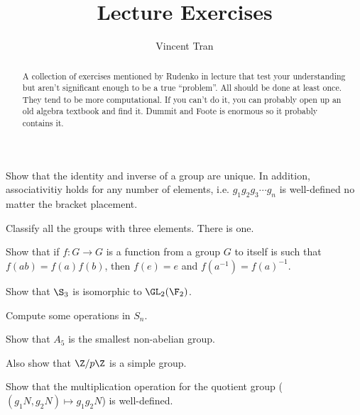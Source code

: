 \documentclass{amsart}
\title{Lecture Exercises}
\author{Vincent Tran}
\begin{document}
\begin{abstract}
	A collection of exercises mentioned by Rudenko in lecture that test your understanding but aren't significant enough to be a true ``problem''.
	All should be done at least once.
	They tend to be more computational.
	If you can't do it, you can probably open up an old algebra textbook and find it.
	Dummit and Foote is enormous so it probably contains it.
\end{abstract}

\maketitle

\begin{exercise}
	Show that the identity and inverse of a group are unique.
	In addition, associativitiy holds for any number of elements, i.e. $g_{1}g_{2}g_{3}\cdots g_n $ is well-defined no matter the bracket placement.
\end{exercise}

\begin{exercise}
	Classify all the groups with three elements.
	\ifhint
		There is one.
	\fi
\end{exercise}

\begin{exercise}
	Show that if $f: G\to G $ is a function from a group $G $ to itself is such that $f(ab) = f(a) f(b) $, then $f(e) = e $ and $f(a^{-1}) = f(a)^{-1} $.
\end{exercise}

\begin{exercise}
	Show that $\S_3 $ is isomorphic to $\GL_2(\F_2) $.
\end{exercise}

\begin{exercise}
	Compute some operations in $S_n $.
\end{exercise}

\begin{exercise}
	Show that $A_5 $ is the smallest non-abelian group.

	Also show that $\Z / p\Z $ is a simple group.
\end{exercise}

\begin{exercise}
	Show that the multiplication operation for the quotient group ($(g_{1}N,g_{2}N) \mapsto g_{1}g_{2}N $) is well-defined.
\end{exercise}
\end{document}
